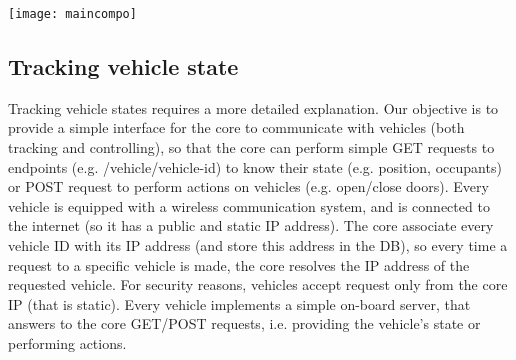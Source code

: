 \texttt{[image: maincompo]}

\subsection{Tracking vehicle state}
Tracking vehicle states requires a more detailed explanation. Our objective is to provide a simple interface for the core to communicate with vehicles (both tracking and controlling), so that the core can perform simple GET requests to endpoints (e.g. /vehicle/vehicle-id) to know their state (e.g. position, occupants) or POST request to perform actions on vehicles (e.g. open/close doors). Every vehicle is equipped with a wireless communication system, and is connected to the internet (so it has a public and static IP address). The core associate every vehicle ID with its IP address (and store this address in the DB), so every time a request to a specific vehicle is made, the core resolves the IP address of the requested vehicle. For security reasons, vehicles accept request only from the core IP (that is static). Every vehicle implements a simple on-board server, that answers to the core GET/POST requests, i.e. providing the vehicle's state or performing actions. 

